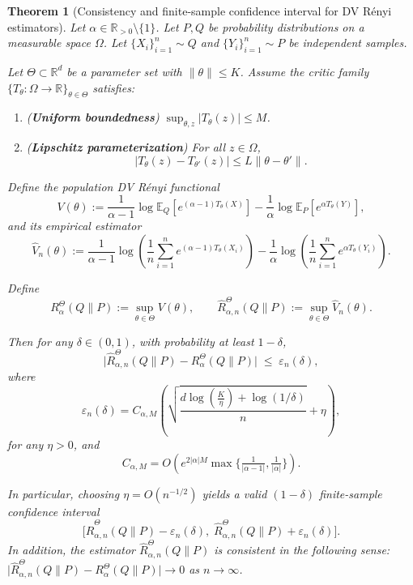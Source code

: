 \documentclass{article}
\theoremstyle{plain}
\newtheorem{theorem}{Theorem}[section]
\theoremstyle{definition}
\theoremstyle{remark}
\begin{document}
\begin{theorem}[Consistency and finite-sample confidence interval for DV R\'enyi estimators]
\label{thm:finite-sample-dv-renyi-app}
Let $\alpha\in\mathbb{R}_{> 0}\setminus\{1\}$.  
Let $P,Q$ be probability distributions on a measurable space $\Omega$.
Let $\{X_i\}_{i=1}^n \sim Q$ and $\{Y_i\}_{i=1}^n \sim P$ be independent samples.

Let $\Theta \subset \mathbb{R}^d$ be a parameter set with $\|\theta\|\le K$.
Assume the critic family $\{T_\theta:\Omega\to\mathbb{R}\}_{\theta\in\Theta}$ satisfies:
\begin{enumerate}
\item (\textbf{Uniform boundedness}) $\sup_{\theta,z}|T_\theta(z)| \le M$.
\item (\textbf{Lipschitz parameterization}) For all $z\in\Omega$,
\[
|T_\theta(z)-T_{\theta'}(z)| \le L \|\theta-\theta'\| .
\]
\end{enumerate}

Define the population DV R\'enyi functional
\[
V(\theta)
:=\frac{1}{\alpha-1}\log \mathbb{E}_{Q}\!\left[e^{(\alpha-1)T_\theta(X)}\right]
-\frac{1}{\alpha}\log \mathbb{E}_{P}\!\left[e^{\alpha T_\theta(Y)}\right],
\]
and its empirical estimator
\[
\widehat V_n(\theta)
:=\frac{1}{\alpha-1}\log\!\left(\frac{1}{n}\sum_{i=1}^n e^{(\alpha-1)T_\theta(X_i)}\right)
-\frac{1}{\alpha}\log\!\left(\frac{1}{n}\sum_{i=1}^n e^{\alpha T_\theta(Y_i)}\right).
\]

Define
\[
R_\alpha^{\Theta}(Q\|P):=\sup_{\theta\in\Theta} V(\theta),
\qquad
\widehat R_{\alpha,n}^{\Theta}(Q\|P):=\sup_{\theta\in\Theta} \widehat V_n(\theta).
\]

Then for any $\delta\in(0,1)$, with probability at least $1-\delta$,
\[
\big|\widehat R_{\alpha,n}^{\Theta}(Q\|P)-R_\alpha^{\Theta}(Q\|P)\big|
\;\le\;
\varepsilon_n(\delta),
\]
where
\[
\varepsilon_n(\delta)
=
C_{\alpha,M}
\left(
\sqrt{\frac{d\log\!\left(\frac{K}{\eta}\right)+\log(1/\delta)}{n}}
+
\eta
\right),
\]
for any $\eta>0$, and
\[
C_{\alpha,M}
=
O\!\left(
e^{2|\alpha|M}\max\Big\{\tfrac{1}{|\alpha-1|},\tfrac{1}{|\alpha|}\Big\}
\right).
\]

In particular, choosing $\eta = O(n^{-1/2})$ yields a valid $(1-\delta)$
finite-sample confidence interval
\[
\Big[
\widehat R_{\alpha,n}^{\Theta}(Q\|P)-\varepsilon_n(\delta),
\;
\widehat R_{\alpha,n}^{\Theta}(Q\|P)+\varepsilon_n(\delta)
\Big].
\]
In addition,
the estimator $\widehat R_{\alpha,n}^{\Theta}(Q\|P)$ is consistent in the following sense:
$\big|\widehat R_{\alpha,n}^{\Theta}(Q\|P)-R_\alpha^{\Theta}(Q\|P)\big|\rightarrow 0$ as $n\rightarrow\infty$.
\end{theorem}
\end{document}
